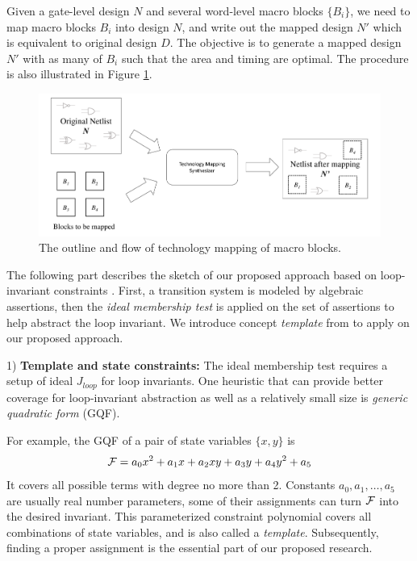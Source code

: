 \begin{Problem}
Given a gate-level design $N$ and several word-level macro blocks $\{B_i\}$, we need to map macro
blocks $B_i$ into design $N$, and write out the mapped design $N'$ which is equivalent to original
design $D$. The objective is to generate a mapped design $N'$ with as many of $B_i$ such that the area
and timing are optimal. The procedure is also illustrated in Figure \ref{fig:macro}.

\begin{figure}[bp]
	\begin{center}
	\includegraphics[width=\textwidth]{newfig/macro.pdf}
	\end{center}
	\caption{The outline and flow of technology mapping of macro blocks.}
	\label{fig:macro}
\end{figure}

\end{Problem}

The following part describes the sketch of our proposed approach based on loop-invariant constraints \cite{sankaranarayanan2004non}.
First, a transition system is modeled by algebraic assertions, then the \emph{ideal membership test} \cite{lv:phd}
is applied on the set of assertions to help abstract the loop invariant. We introduce concept \emph{template}
from \cite{sankaranarayanan2004non} to apply on our proposed approach.

1) {\bf Template and state constraints:}  The ideal membership test requires a setup of ideal $J_{loop}$
for loop invariants. 
One heuristic that can provide better coverage for loop-invariant abstraction as well as a
relatively small size is \emph{generic quadratic form} (GQF).

For example, the GQF of a pair of state variables $\{x,y\}$ is
$${\mathcal{F}} = a_0x^2+a_1x+a_2xy+a_3y+a_4y^2+a_5$$
It covers all possible terms with degree no more than 2. Constants $a_0,a_1,\dots, a_5$ are 
usually real number parameters,
some of their assignments can turn ${\mathcal{F}}$ into the desired invariant. This parameterized constraint
polynomial covers all combinations of state variables, and is also called a \emph{template}.
Subsequently, finding a proper assignment is the essential part of our proposed research.


